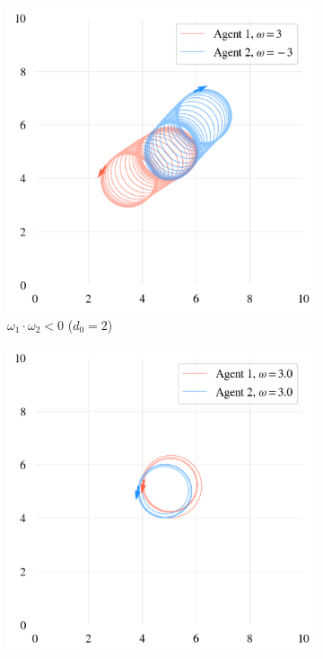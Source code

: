 \documentclass{article}
\begin{document}
\begin{figure}[H]
	\centering

	\begin{subfigure}[b]{0.49\textwidth}
		\includegraphics[width=\textwidth]{./figs/diffChir.png}
		\vspace{-1cm}
		\caption{$\omega_1 \cdot \omega_2 < 0$ ($d_0=2$)}
	\end{subfigure}
	\begin{subfigure}[b]{0.49\textwidth}
		\includegraphics[width=\textwidth]{./figs/sameChir.png}

\end{subfigure}
\end{figure}
\end{document}
